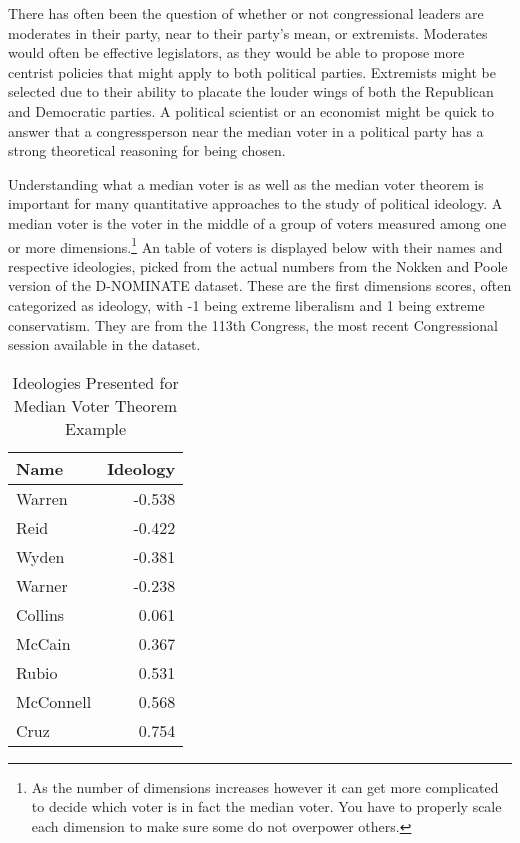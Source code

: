 \documentclass[12pt,twoside]{reedthesis}
\begin{document}
  There has often been the question of whether or not congressional
  leaders are moderates in their party, near to their party's mean, or
  extremists. Moderates would often be effective legislators, as they
  would be able to propose more centrist policies that might apply to both
  political parties. Extremists might be selected due to their ability to
  placate the louder wings of both the Republican and Democratic parties.
  A political scientist or an economist might be quick to answer that a
  congressperson near the median voter in a political party has a strong
  theoretical reasoning for being chosen.
  
  Understanding what a median voter is as well as the median voter theorem
  is important for many quantitative approaches to the study of political
  ideology. A median voter is the voter in the middle of a group of voters
  measured among one or more
  dimensions.\footnote{As the number of dimensions increases however it can get more complicated to decide which voter is in fact the median voter. You have to properly scale each dimension to make sure some do not overpower others.}
  An table of voters is displayed below with their names and respective
  ideologies, picked from the actual numbers from the Nokken and Poole
  version of the D-NOMINATE dataset. These are the first dimensions
  scores, often categorized as ideology, with -1 being extreme liberalism
  and 1 being extreme conservatism. They are from the 113th Congress, the
  most recent Congressional session available in the dataset.
  
  \begin{table}[]
  \centering
  \caption{Ideologies Presented for Median Voter Theorem Example}
  \begin{tabular}{l|r}
  Name      & Ideology \\ \hline
  Warren    & -0.538   \\
  Reid      & -0.422   \\
  Wyden     & -0.381   \\
  Warner    & -0.238   \\
  Collins   & 0.061    \\
  McCain    & 0.367    \\
  Rubio     & 0.531    \\
  McConnell & 0.568    \\
  Cruz      & 0.754   
  \end{tabular}
  \end{table}
  
\end{document}
